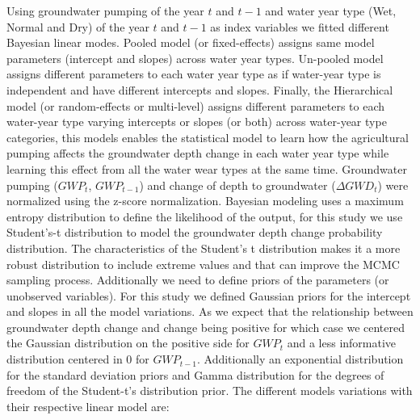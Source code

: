 \documentclass[11pt,a4paper]{article}
\begin{document}
Using groundwater pumping of the year $t$ and $t-1$ and water year type (Wet, Normal and Dry) of the year $t$ and $t-1$ as index variables we fitted different Bayesian linear modes. Pooled model (or fixed-effects) assigns same model parameters (intercept and slopes) across water year types. Un-pooled model assigns different parameters to each water year type as if water-year type is independent and have different intercepts and slopes. Finally, the Hierarchical model (or random-effects or multi-level) assigns different parameters to each water-year type varying intercepts or slopes (or both) across water-year type categories, this models enables the statistical model to learn how the agricultural pumping affects the groundwater depth change in each water year type while learning this effect from all the water wear types at the same time. Groundwater pumping ($GWP_{t}$, $GWP_{t-1}$) and change of depth to groundwater ($\Delta{GWD}_t$) were normalized using the z-score normalization. Bayesian modeling uses a maximum entropy distribution to define the likelihood of the output, for this study we use Student's-t distribution to model the groundwater depth change probability distribution. The characteristics of the Student's t distribution makes it a more robust distribution to include extreme values and that can improve the MCMC sampling process. Additionally we need to define priors of the parameters (or unobserved variables). For this study we defined Gaussian priors for the intercept and slopes in all the model variations. As we expect that the relationship between groundwater depth change and change being positive for which case we centered the Gaussian distribution on the positive side for ${GWP}_t$ and a less informative distribution centered in 0 for ${GWP}_{t-1}$. Additionally an exponential distribution for the standard deviation priors  and Gamma distribution for the degrees of freedom of the Student-t's distribution prior.  The different models variations with their respective linear model are: 
\end{document}
